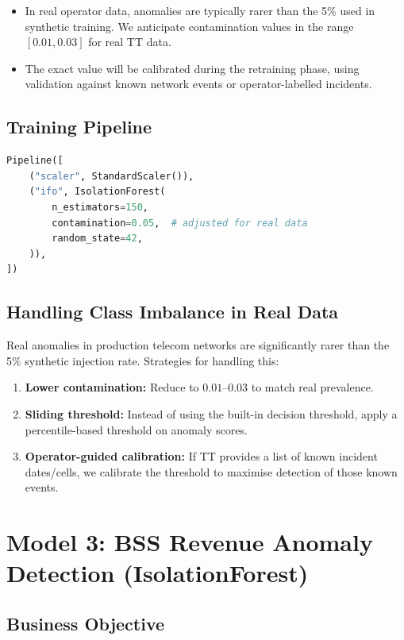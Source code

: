 \begin{itemize}
  \item In real operator data, anomalies are typically rarer than the 5\% used in synthetic training. We anticipate contamination values in the range $[0.01, 0.03]$ for real TT data.
  \item The exact value will be calibrated during the retraining phase, using validation against known network events or operator-labelled incidents.
\end{itemize}

\subsection{Training Pipeline}

\begin{lstlisting}[language=Python, caption={OSS Anomaly model training pipeline.}]
Pipeline([
    ("scaler", StandardScaler()),
    ("ifo", IsolationForest(
        n_estimators=150,
        contamination=0.05,  # adjusted for real data
        random_state=42,
    )),
])
\end{lstlisting}

\subsection{Handling Class Imbalance in Real Data}

Real anomalies in production telecom networks are significantly rarer than the 5\% synthetic injection rate. Strategies for handling this:

\begin{enumerate}
  \item \textbf{Lower contamination:} Reduce to $0.01$--$0.03$ to match real prevalence.
  \item \textbf{Sliding threshold:} Instead of using the built-in decision threshold, apply a percentile-based threshold on anomaly scores.
  \item \textbf{Operator-guided calibration:} If TT provides a list of known incident dates/cells, we calibrate the threshold to maximise detection of those known events.
\end{enumerate}

\section{Model 3: BSS Revenue Anomaly Detection (IsolationForest)}

\subsection{Business Objective}

